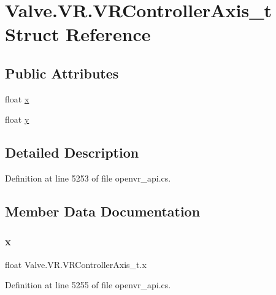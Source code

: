 \hypertarget{struct_valve_1_1_v_r_1_1_v_r_controller_axis__t}{}\section{Valve.\+V\+R.\+V\+R\+Controller\+Axis\+\_\+t Struct Reference}
\label{struct_valve_1_1_v_r_1_1_v_r_controller_axis__t}
\subsection*{Public Attributes}
\begin{DoxyCompactItemize}
\item 
float \mbox{\hyperlink{struct_valve_1_1_v_r_1_1_v_r_controller_axis__t_aca6b20a87bdf0db7a147f82c3282ced3}{x}}
\item 
float \mbox{\hyperlink{struct_valve_1_1_v_r_1_1_v_r_controller_axis__t_aa26615340e7cdac74e2987fa7672f7ca}{y}}
\end{DoxyCompactItemize}


\subsection{Detailed Description}


Definition at line 5253 of file openvr\+\_\+api.\+cs.



\subsection{Member Data Documentation}
\mbox{\label{struct_valve_1_1_v_r_1_1_v_r_controller_axis__t_aca6b20a87bdf0db7a147f82c3282ced3}} 
\subsubsection{\texorpdfstring{x}{x}}
{\footnotesize\ttfamily float Valve.\+V\+R.\+V\+R\+Controller\+Axis\+\_\+t.\+x}



Definition at line 5255 of file openvr\+\_\+api.\+cs.

\mbox{\label{struct_valve_1_1_v_r_1_1_v_r_controller_axis__t_aa26615340e7cdac74e2987fa7672f7ca}} 
